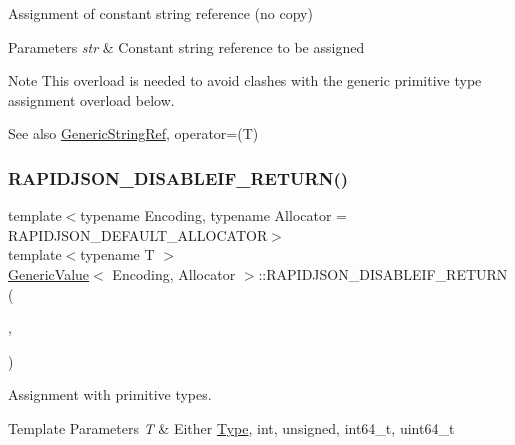 Assignment of constant string reference (no copy) 


\begin{DoxyParams}{Parameters}
{\em str} & Constant string reference to be assigned \\
\hline
\end{DoxyParams}
\begin{DoxyNote}{Note}
This overload is needed to avoid clashes with the generic primitive type assignment overload below. 
\end{DoxyNote}
\begin{DoxySeeAlso}{See also}
\hyperlink{structGenericStringRef}{Generic\+String\+Ref}, operator=(\+T) 
\end{DoxySeeAlso}
\mbox{\label{classGenericValue_a4a4418a93777942e1fb7ea71f8aaf680}} 
\subsubsection{\texorpdfstring{R\+A\+P\+I\+D\+J\+S\+O\+N\+\_\+\+D\+I\+S\+A\+B\+L\+E\+I\+F\+\_\+\+R\+E\+T\+U\+R\+N()}{RAPIDJSON\_DISABLEIF\_RETURN()}}
{\footnotesize\ttfamily template$<$typename Encoding, typename Allocator = R\+A\+P\+I\+D\+J\+S\+O\+N\+\_\+\+D\+E\+F\+A\+U\+L\+T\+\_\+\+A\+L\+L\+O\+C\+A\+T\+OR$>$ \\
template$<$typename T $>$ \\
\hyperlink{classGenericValue}{Generic\+Value}$<$ Encoding, Allocator $>$\+::R\+A\+P\+I\+D\+J\+S\+O\+N\+\_\+\+D\+I\+S\+A\+B\+L\+E\+I\+F\+\_\+\+R\+E\+T\+U\+RN (\begin{DoxyParamCaption}\item[{(internal\+::\+Is\+Pointer$<$ T $>$)}]{,  }\item[{(\hyperlink{classGenericValue}{Generic\+Value}$<$ Encoding, Allocator $>$ \&)}]{ }\end{DoxyParamCaption})}



Assignment with primitive types. 


\begin{DoxyTemplParams}{Template Parameters}
{\em T} & Either \hyperlink{rapidjson_8h_a1d1cfd8ffb84e947f82999c682b666a7}{Type}, {\ttfamily int}, {\ttfamily unsigned}, {\ttfamily int64\+\_\+t}, {\ttfamily uint64\+\_\+t} \\
\hline
\end{DoxyTemplParams}

